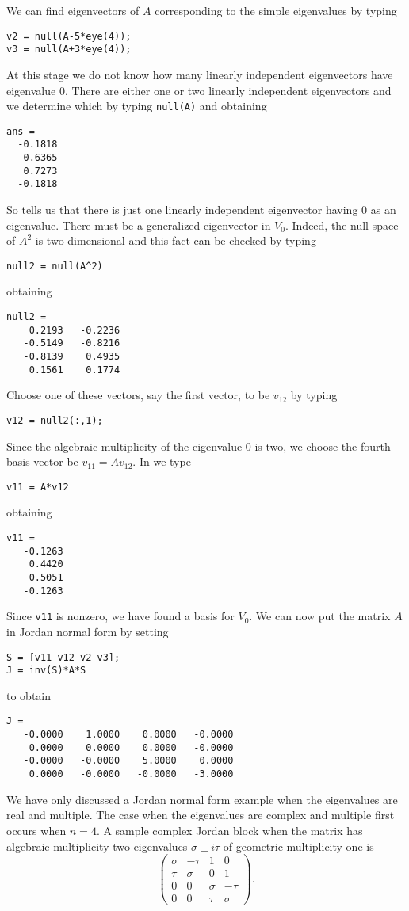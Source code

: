 \documentclass{ximera}
\begin{document}
We can find eigenvectors of $A$ corresponding to the simple
eigenvalues by typing
\begin{verbatim}
v2 = null(A-5*eye(4));
v3 = null(A+3*eye(4));
\end{verbatim}
At this stage we do not know how many linearly independent
eigenvectors have eigenvalue $0$.  There are either one or two linearly
independent eigenvectors and we determine which by typing {\tt null(A)} 
and obtaining
\begin{verbatim}
ans =
  -0.1818
   0.6365
   0.7273
  -0.1818
\end{verbatim}
So \Matlab tells us that there is just one linearly independent
eigenvector having $0$ as an eigenvalue.  There must be a generalized
eigenvector
in $V_0$.  Indeed, the null space of $A^2$ is two dimensional
and this fact can be checked by typing
\begin{verbatim}
null2 = null(A^2)
\end{verbatim}
obtaining
\begin{verbatim}
null2 =
    0.2193   -0.2236
   -0.5149   -0.8216
   -0.8139    0.4935
    0.1561    0.1774
\end{verbatim}
Choose one of these vectors, say the first vector, to be $v_{12}$ by typing
\begin{verbatim}
v12 = null2(:,1);
\end{verbatim}
Since the algebraic multiplicity
of the eigenvalue $0$ is two, we choose the 
fourth basis vector be $v_{11}=Av_{12}$.  In \Matlab we type 
\begin{verbatim}
v11 = A*v12
\end{verbatim}
obtaining
\begin{verbatim}
v11 =
   -0.1263
    0.4420
    0.5051
   -0.1263
\end{verbatim}
Since {\tt v11} is nonzero, we have found a basis for $V_0$.
We can now put the matrix $A$ in Jordan normal 
form
by setting 
\begin{verbatim}
S = [v11 v12 v2 v3];
J = inv(S)*A*S
\end{verbatim}
to obtain
\begin{verbatim}
J = 
   -0.0000    1.0000    0.0000   -0.0000
    0.0000    0.0000    0.0000   -0.0000
   -0.0000   -0.0000    5.0000    0.0000
    0.0000   -0.0000   -0.0000   -3.0000
\end{verbatim}

We have only discussed a Jordan normal form example when the eigenvalues
are real and multiple.  The case when the eigenvalues are complex and 
multiple first occurs when $n=4$. 
A sample complex Jordan block when the 
matrix has algebraic multiplicity two eigenvalues $\sigma\pm i\tau$ of 
geometric multiplicity one is
\[
\left(\begin{array}{rrrr} \sigma & -\tau & 1 & 0 \\ 
\tau & \sigma & 0 & 1 \\ 0 & 0 & \sigma & -\tau \\
0 & 0 & \tau & \sigma \end{array}\right).
\]
\end{document}
